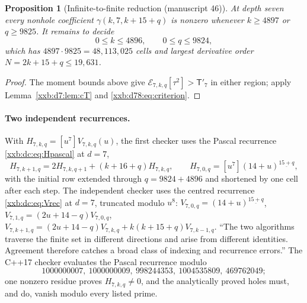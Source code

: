 \documentclass[11pt,a4paper]{article}
\numberwithin{equation}{section}
\newtheorem{proposition}[theorem]{Proposition}
\theoremstyle{definition}
\theoremstyle{remark}
\theoremstyle{plain}
\newcommand{\fall}[2]{#1^{\underline{#2}}}
\begin{document}
\begin{proposition}[Infinite-to-finite reduction (manuscript 46)]\label{xxb:d7:prop:reduction}
At depth seven every nonhole coefficient $\gamma(k,7,k+15+q)$ is nonzero
whenever $k\ge4897$ or $q\ge9825$.  It remains to decide
\begin{equation}\label{xxb:d7:eq:rectangle}
 0\le k\le4896,\qquad 0\le q\le9824,
\end{equation}
which has $4897\cdot9825=48{,}113{,}025$ cells and largest derivative order
$N=2k+15+q\le19{,}631$.
\end{proposition}
\begin{proof}
The moment bounds above give $\mathcal E_{7,k,q}[\tau^2]>\mathsf T'_7$ in either
region; apply Lemma~\ref{xxb:d7:lem:cT} and \eqref{xxb:d78:eq:criterion}.
\end{proof}

\paragraph{Two independent recurrences.}  With $H_{7,k,q}=[u^7]V_{7,k,q}(u)$,
the first checker uses the Pascal recurrence \eqref{xxb:dc:eq:Hpascal} at
$d=7$,
\begin{equation}\label{xxb:d7:eq:pascal}
 H_{7,k+1,q}=2H_{7,k,q+1}+(k+16+q)H_{7,k,q},\qquad
 H_{7,0,q}=[u^7]\fall{(14+u)}{15+q},
\end{equation}
with the initial row extended through $q=9824+4896$ and shortened by one cell
after each step.  The independent checker uses the centred recurrence
\eqref{xxb:dc:eq:Vrec} at $d=7$, truncated modulo $u^8$:
$V_{7,0,q}=\fall{(14+u)}{15+q}$, $V_{7,1,q}=(2u+14-q)V_{7,0,q}$,
$V_{7,k+1,q}=(2u+14-q)V_{7,k,q}+k(k+15+q)V_{7,k-1,q}$.  ``The two algorithms
traverse the finite set in different directions and arise from different
identities.  Agreement therefore catches a broad class of indexing and
recurrence errors.''  The C++17 checker evaluates the Pascal recurrence modulo
\begin{equation}\label{xxb:d7:eq:primes}
 1000000007,\ 1000000009,\ 998244353,\ 1004535809,\ 469762049;
\end{equation}
one nonzero residue proves $H_{7,k,q}\ne0$, and the analytically proved holes
must, and do, vanish modulo every listed prime.
\end{document}
